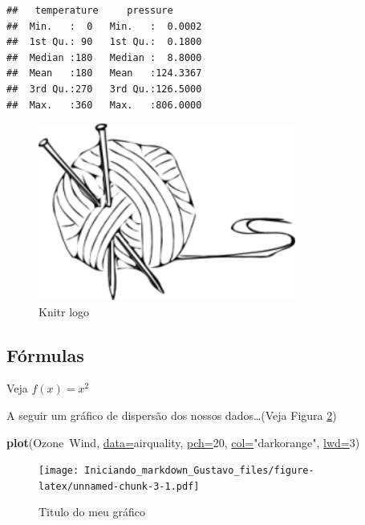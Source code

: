 \documentclass[]{article}
\newenvironment{Shaded}{\begin{snugshade}}{\end{snugshade}}
\newcommand{\DataTypeTok}[1]{\textcolor[rgb]{0.74,0.68,0.62}{\underline{#1}}}
\newcommand{\DecValTok}[1]{\textcolor[rgb]{0.27,0.67,0.26}{#1}}
\newcommand{\KeywordTok}[1]{\textcolor[rgb]{0.26,0.66,0.93}{\textbf{#1}}}
\newcommand{\NormalTok}[1]{\textcolor[rgb]{0.74,0.68,0.62}{#1}}
\newcommand{\OperatorTok}[1]{\textcolor[rgb]{0.74,0.68,0.62}{#1}}
\newcommand{\StringTok}[1]{\textcolor[rgb]{0.02,0.61,0.04}{#1}}
\begin{document}
\begin{verbatim}
##   temperature     pressure       
##  Min.   :  0   Min.   :  0.0002  
##  1st Qu.: 90   1st Qu.:  0.1800  
##  Median :180   Median :  8.8000  
##  Mean   :180   Mean   :124.3367  
##  3rd Qu.:270   3rd Qu.:126.5000  
##  Max.   :360   Max.   :806.0000
\end{verbatim}

\begin{figure}

{\centering \includegraphics[width=3.33in]{knit_logo} 

}

\caption{Knitr logo}\label{fig:unnamed-chunk-2}
\end{figure}

\hypertarget{fuxf3rmulas}{%
\subsection{Fórmulas}\label{fuxf3rmulas}}

Veja \(f(x)=x^2\)

A seguir um gráfico de dispersão dos nossos dados\ldots{}(Veja Figura
\ref{scatterplot})

\begin{Shaded}
\begin{Highlighting}[]
\KeywordTok{plot}\NormalTok{(Ozone}\OperatorTok{~}\NormalTok{Wind, }\DataTypeTok{data=}\NormalTok{airquality, }\DataTypeTok{pch=}\DecValTok{20}\NormalTok{, }
     \DataTypeTok{col=}\StringTok{"darkorange"}\NormalTok{, }\DataTypeTok{lwd=}\DecValTok{3}\NormalTok{)}
\end{Highlighting}
\end{Shaded}

\begin{figure}
\centering
\texttt{[image: Iniciando\_markdown\_Gustavo\_files/figure-latex/unnamed-chunk-3-1.pdf]}
\caption{\label{scatterplot}Titulo do meu gráfico}
\end{figure}
\end{document}
